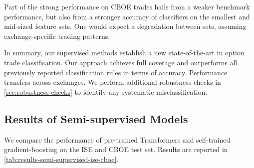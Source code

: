 Part of the strong performance on \gls{CBOE} trades hails from a weaker benchmark performance, but also from a stronger accuracy of classifiers on the smallest and mid-sized feature sets. One would expect a degradation between sets, assuming exchange-specific trading patterns.

In summary, our supervised methods establish a new state-of-the-art in option trade classification. Our approach achieves full coverage and outperforms all previously reported classification rules in terms of accuracy. Performance transfers across exchanges. We perform additional robustness checks in \cref{sec:robustness-checks} to identify any systematic misclassification.

\subsection{Results of Semi-supervised
    Models}\label{sec:results-of-semi-supervised-models}

We compare the performance of pre-trained Transformers and self-trained gradient-boosting on the \gls{ISE} and \gls{CBOE} test set. Results are reported in \cref{tab:results-semi-supervised-ise-cboe}.


